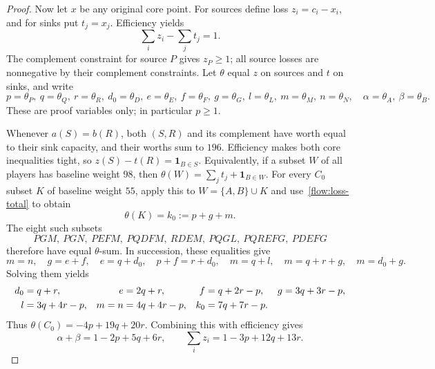 \documentclass[11pt]{article}
\theoremstyle{remark}
\begin{document}
\begin{proof}
Now let $x$ be any original core point. For sources define loss
$z_i=c_i-x_i$, and for sinks put $t_j=x_j$. Efficiency yields
\begin{equation}\label{flow:loss-total}
                       \sum_i z_i-\sum_j t_j=1.
\end{equation}
The complement constraint for source $P$ gives $z_P\ge1$;
all source losses are nonnegative by their complement constraints.
Let $\theta$ equal $z$ on sources and $t$ on sinks, and write
\[
 p=\theta_P,\ q=\theta_Q,\ r=\theta_R,\ d_0=\theta_D,
 \ e=\theta_E,\ f=\theta_F,\ g=\theta_G,\ l=\theta_L,
 \ m=\theta_M,\ n=\theta_N,\quad
 \alpha=\theta_A,\ \beta=\theta_B.
\]
These are proof variables only; in particular $p\ge1$.

Whenever $a(S)=b(R)$, both $(S,R)$ and its complement have worth
equal to their sink capacity, and their worths sum to $196$.
Efficiency makes both core inequalities tight, so
$z(S)-t(R)=\mathbf1_{B\in S}$. Equivalently, if a subset $W$ of all
players has baseline weight $98$, then
$\theta(W)=\sum_jt_j+\mathbf1_{B\in W}$.
For every $C_0$ subset $K$ of baseline weight $55$, apply this to
$W=\{A,B\}\cup K$ and use~\eqref{flow:loss-total} to obtain
\[
                     \theta(K)=k_0:=p+g+m.
\]
The eight such subsets
\[
 PGM,\ PGN,\ PEFM,\ PQDFM,\ RDEM,\ PQGL,\ PQREFG,\ PDEFG
\]
therefore have equal $\theta$-sum. In succession, these equalities give
\[
 m=n,\quad g=e+f,\quad e=q+d_0,\quad p+f=r+d_0,
 \quad m=q+l,\quad m=q+r+g,\quad m=d_0+g.
\]
Solving them yields
\begin{align}
 d_0&=q+r,&e&=2q+r,&f&=q+2r-p,&g&=3q+3r-p,\notag\\
 l&=3q+4r-p,&m=n&=4q+4r-p,&k_0&=7q+7r-p.
       \label{flow:identities}
\end{align}
Thus $\theta(C_0)=-4p+19q+20r$. Combining this with efficiency gives
\begin{equation}\label{flow:loss-formulas}
 \alpha+\beta=1-2p+5q+6r,\qquad
                 \sum_i z_i=1-3p+12q+13r.
\end{equation}


\end{proof}
\end{document}
